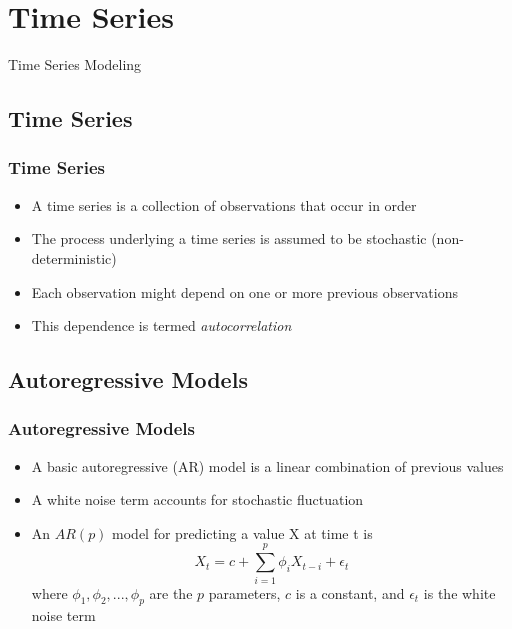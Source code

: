 \documentclass[presentation]{beamer}
\begin{document}
\section{Time Series}

\begin{frame}
\begin{center}
\Large{Time Series Modeling}
\end{center}
\end{frame}


\subsection{Time Series}

\begin{frame}[t]
\frametitle{Time Series }
\begin{itemize}
\item{A time series is a collection of observations that occur in order}
\item{The process underlying a time series is assumed to be stochastic (non-deterministic)}
\item{Each observation might depend on one or more previous observations}
\item{This dependence is termed \textit{autocorrelation}}
\end{itemize}
\end{frame}

\subsection{Autoregressive Models}

\begin{frame}[t]
\frametitle{Autoregressive Models}
\begin{itemize}
\item{A basic autoregressive (AR) model is a linear combination of previous values}
\item{A white noise term accounts for stochastic fluctuation}
\item{An $AR(p)$ model for predicting a value X at time t is
\begin{equation}
X_t=c+\sum_{i=1}^{p}{\phi_i X_{t-i}+\epsilon_t}
\end{equation}
where $\phi_1, \phi_2, ..., \phi_p$ are the $p$ parameters, $c$ is a constant, and $\epsilon_t$ is the white noise term}
\end{itemize}
\end{frame}
\end{document}
